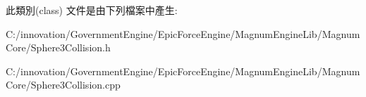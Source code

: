 此類別(class) 文件是由下列檔案中產生\+:\begin{DoxyCompactItemize}
\item 
C\+:/innovation/\+Government\+Engine/\+Epic\+Force\+Engine/\+Magnum\+Engine\+Lib/\+Magnum\+Core/Sphere3\+Collision.\+h\item 
C\+:/innovation/\+Government\+Engine/\+Epic\+Force\+Engine/\+Magnum\+Engine\+Lib/\+Magnum\+Core/Sphere3\+Collision.\+cpp\end{DoxyCompactItemize}
